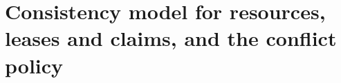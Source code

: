 \section{Consistency model for resources, leases and claims, and the conflict policy}
\label{sec:claims}
%
